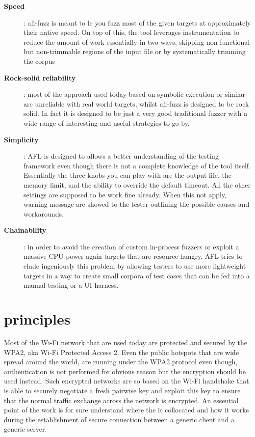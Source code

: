 \begin{description}
    \item[\textbf{Speed}]: afl-fuzz is meant to le you fuzz most of the given targets at approximately their native speed. On top of this, the tool leverages instrumentation
    to reduce the amount of work essentially in two ways, \ie skipping non-functional but non-trimmable regions of the input file or by systematically trimming the corpus 
    \item[\textbf{Rock-solid reliability}]: most of the approach used today based on symbolic execution or similar are unreliable with real world targets, whilst afl-fuzz is
    designed to be rock solid. In fact it is designed to be just a very good traditional fuzzer with a wide range of interesting and useful strategies to go by. 
    \item[\textbf{Simplicity}]: AFL is designed to allows a better understanding of the testing framework even though there is not a complete knowledge of the tool itself.
    Essentially the three knobs you can play with are the output file, the memory limit, and the ability to override the default timeout. All the other settings are supposed to be
    work fine already. When this not apply, warning message are showed to the tester outlining the possible causes and workarounds.
    \item[\textbf{Chainability}]: in order to avoid the creation of custom in-process fuzzers or exploit a massive CPU power again targets that are resource-hungry, AFL tries to
    elude ingeniously this problem by allowing testers to use more lightweight targets in a way to create small corpora of test cases that can be fed into a manual testing or a UI harness.
\end{description}


  

\section{\fwh principles} %

Most of the Wi-Fi network that are used today are protected and secured by the WPA2, aka Wi-Fi Protected Access 2.
Even the public hotspots that are wide spread around the world, are running under the WPA2 protocol even though,
authentication is not performed for obvious reason but the encryption should be used instead. Such encrypted networks are so based on the Wi-Fi handshake that is able 
to securely negotiate a fresh pairwise key and exploit this key to ensure that the normal traffic exchange across the network is encrypted.
An essential point of the  work is for sure understand where the \fwh is collocated and how it works during the establishment of secure connection
between a generic client and a generic server.

